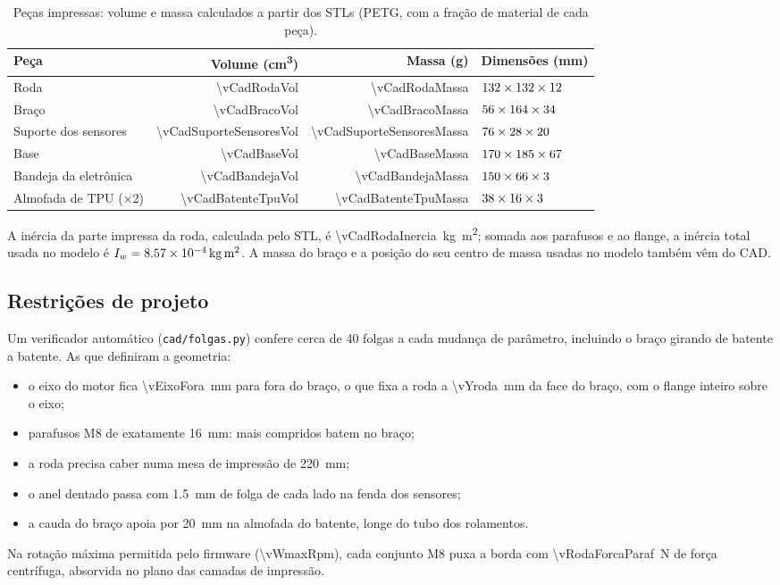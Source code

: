 \documentclass[11pt,a4paper]{article}
\begin{document}
\begin{table}[H]
\centering
\caption{Peças impressas: volume e massa calculados a partir dos STLs (PETG, com a fração de
material de cada peça).}
\label{tab:massas}
\begin{tabular}{lrrl}
\toprule
Peça & Volume (\unit{\centi\metre\cubed}) & Massa (\unit{\gram}) & Dimensões (\unit{\milli\metre}) \\
\midrule
Roda              & \num{\vCadRodaVol}            & \num{\vCadRodaMassa}            & $132 \times 132 \times 12$ \\
Braço             & \num{\vCadBracoVol}           & \num{\vCadBracoMassa}           & $56 \times 164 \times 34$ \\
Suporte dos sensores & \num{\vCadSuporteSensoresVol} & \num{\vCadSuporteSensoresMassa} & $76 \times 28 \times 20$ \\
Base              & \num{\vCadBaseVol}            & \num{\vCadBaseMassa}            & $170 \times 185 \times 67$ \\
Bandeja da eletrônica & \num{\vCadBandejaVol}     & \num{\vCadBandejaMassa}         & $150 \times 66 \times 3$ \\
Almofada de TPU (×2) & \num{\vCadBatenteTpuVol}   & \num{\vCadBatenteTpuMassa}      & $38 \times 16 \times 3$ \\
\bottomrule
\end{tabular}
\end{table}

A inércia da parte impressa da roda, calculada pelo STL, é
\qty{\vCadRodaInercia}{\kilo\gram\metre\squared}; somada aos parafusos e ao flange, a inércia total
usada no modelo é $I_w = \qty{8.57e-4}{\kilo\gram\metre\squared}$. A massa do braço e a posição do
seu centro de massa usadas no modelo também vêm do CAD.

\subsection{Restrições de projeto}

Um verificador automático (\texttt{cad/folgas.py}) confere cerca de 40 folgas a cada mudança de
parâmetro, incluindo o braço girando de batente a batente. As que definiram a geometria:
\begin{itemize}
  \item o eixo do motor fica \qty{\vEixoFora}{\milli\metre} para fora do braço, o que fixa a roda a
    \qty{\vYroda}{\milli\metre} da face do braço, com o flange inteiro sobre o eixo;
  \item parafusos M8 de exatamente \qty{16}{\milli\metre}: mais compridos batem no braço;
  \item a roda precisa caber numa mesa de impressão de \qty{220}{\milli\metre};
  \item o anel dentado passa com \qty{1,5}{\milli\metre} de folga de cada lado na fenda dos sensores;
  \item a cauda do braço apoia por \qty{20}{\milli\metre} na almofada do batente, longe do tubo dos rolamentos.
\end{itemize}
Na rotação máxima permitida pelo firmware (\qty{\vWmaxRpm}{\rpm}), cada conjunto M8 puxa a borda
com \qty{\vRodaForcaParaf}{\newton} de força centrífuga, absorvida no plano das camadas de impressão.
\end{document}
